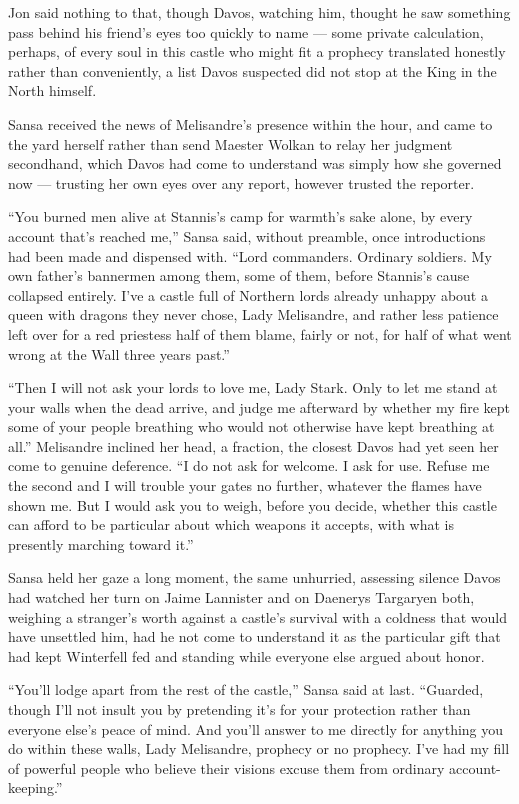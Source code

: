 Jon said nothing to that, though Davos, watching him, thought he saw something pass behind his friend’s eyes too quickly to name — some private calculation, perhaps, of every soul in this castle who might fit a prophecy translated honestly rather than conveniently, a list Davos suspected did not stop at the King in the North himself.

\sceneBreak

Sansa received the news of Melisandre’s presence within the hour, and came to the yard herself rather than send Maester Wolkan to relay her judgment secondhand, which Davos had come to understand was simply how she governed now — trusting her own eyes over any report, however trusted the reporter.

“You burned men alive at Stannis’s camp for warmth’s sake alone, by every account that’s reached me,” Sansa said, without preamble, once introductions had been made and dispensed with. “Lord commanders. Ordinary soldiers. My own father’s bannermen among them, some of them, before Stannis’s cause collapsed entirely. I’ve a castle full of Northern lords already unhappy about a queen with dragons they never chose, Lady Melisandre, and rather less patience left over for a red priestess half of them blame, fairly or not, for half of what went wrong at the Wall three years past.”

“Then I will not ask your lords to love me, Lady Stark. Only to let me stand at your walls when the dead arrive, and judge me afterward by whether my fire kept some of your people breathing who would not otherwise have kept breathing at all.” Melisandre inclined her head, a fraction, the closest Davos had yet seen her come to genuine deference. “I do not ask for welcome. I ask for use. Refuse me the second and I will trouble your gates no further, whatever the flames have shown me. But I would ask you to weigh, before you decide, whether this castle can afford to be particular about which weapons it accepts, with what is presently marching toward it.”

Sansa held her gaze a long moment, the same unhurried, assessing silence Davos had watched her turn on Jaime Lannister and on Daenerys Targaryen both, weighing a stranger’s worth against a castle’s survival with a coldness that would have unsettled him, had he not come to understand it as the particular gift that had kept Winterfell fed and standing while everyone else argued about honor.

“You’ll lodge apart from the rest of the castle,” Sansa said at last. “Guarded, though I’ll not insult you by pretending it’s for your protection rather than everyone else’s peace of mind. And you’ll answer to me directly for anything you do within these walls, Lady Melisandre, prophecy or no prophecy. I’ve had my fill of powerful people who believe their visions excuse them from ordinary account-keeping.”

